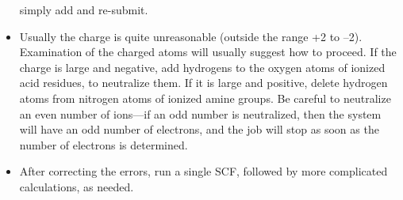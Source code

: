 \begin{itemize}
simply add  and re-submit.
\item Usually the charge is quite unreasonable (outside the range +2 to --2).
Examination of the charged atoms will usually suggest how to proceed.  If the
charge is large and negative, add hydrogens to the oxygen atoms of
ionized acid residues, to
neutralize them.  If it is large and positive, delete hydrogen atoms from
nitrogen atoms of ionized amine groups.
Be careful to neutralize an even number of ions---if an
odd number is neutralized, then the system will have an odd number of electrons,
and the job will stop as soon as the number of electrons is determined.
\item After correcting the errors, run a single SCF, followed by more
complicated calculations, as needed.
\end{itemize}
